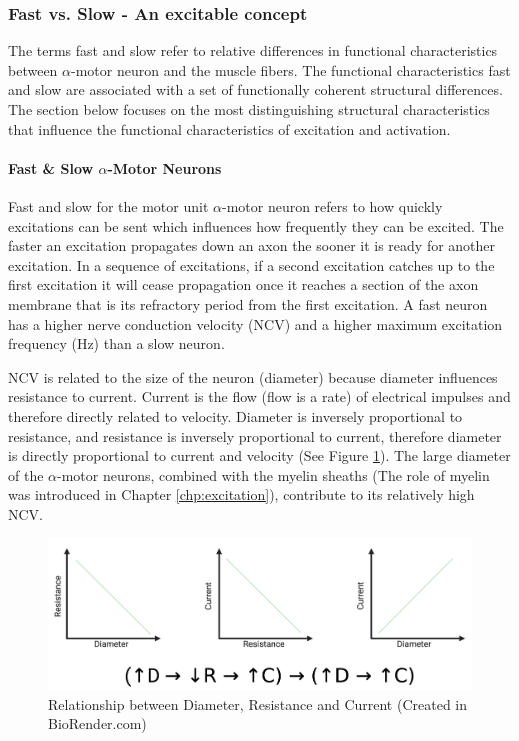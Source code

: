 \subsubsection{Fast vs. Slow - An excitable concept}

The terms fast and slow refer to relative differences in functional characteristics between $\alpha$-motor neuron and the muscle fibers. The functional characteristics fast and slow are associated with a set of functionally coherent structural differences. The section below focuses on the most distinguishing structural characteristics that influence the functional characteristics of excitation and activation.

\paragraph{Fast \& Slow $\alpha$-Motor Neurons}
Fast and slow for the motor unit $\alpha$-motor neuron refers to how quickly excitations can be sent which influences how frequently they can be excited. The faster an excitation propagates down an axon the sooner it is ready for another excitation. In a sequence of excitations, if a second excitation catches up to the first excitation it will cease propagation once it reaches a section of the axon membrane that is its refractory period from the first excitation. A fast neuron has a higher nerve conduction velocity (NCV) and a higher maximum excitation frequency (Hz) than a slow neuron.

NCV is related to the size of the neuron (diameter) because diameter influences resistance to current. Current is the flow (flow is a rate) of electrical impulses and therefore directly related to velocity. Diameter is inversely proportional to resistance, and resistance is inversely proportional to current, therefore diameter is directly proportional to current and velocity (See Figure \ref{fig:Current_Resistance}). The large diameter of the $\alpha$-motor neurons, combined with the myelin sheaths (The role of myelin was introduced in Chapter \ref{chp:excitation}), contribute to its relatively high NCV. 

\begin{figure}[!ht]
    \centering
    \includegraphics[width=1\linewidth]{./figure/Current_Resistance.png}
    \caption{Relationship between Diameter, Resistance and Current \footnotesize{(Created in BioRender.com)}}
    \label{fig:Current_Resistance}
\end{figure}

